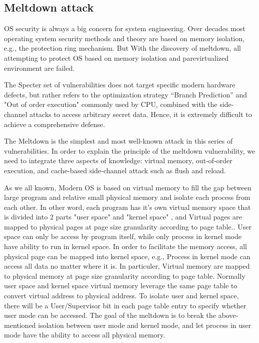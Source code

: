 \subsection{Meltdown attack}

OS security is always a big concern for system engineering. 
Over decades most operating system security methods and theory are based on memory isolation, 
e.g., the protection ring mechanism. But With the discovery of meltdown, all attempting to protect 
OS based on memory isolation and parevirtualized environment are failed.

The Specter set of vulnerabilities does not target specific modern hardware defects, 
but rather refers to the optimization strategy “Branch Prediction” and "Out of order execution" 
commonly used by CPU, combined with the side-channel attacks to access arbitrary secret data.
Hence, it is extremely difficult to achieve a comprehensive defense.

The Meltdown is the simplest and most well-known attack in this series of vulnerabilities. 
In order to explain the principle of the meltdown vulnerability, we need to integrate 
three aspects of knowledge: virtual memory, out-of-order execution, and cache-based side-channel 
attack such as flush and reload.

As we all known, Modern OS is based on virtual memory to fill the gap between 
large program and relative small physical memory and isolate each process from 
each other. In other word, each program has it's own virtual memory space that is 
divided into 2 parts "user space" and "kernel space" , and Virtual pages are mapped 
to physical pages at page size granularity according to page table.. User space can
only be access by program itself, while only process in kernel mode have ability to 
run in kernel space. In order to facilitate the memory access, all physical page can
be mapped into kernel space, e.g., Process in kernel mode can access all data no
matter where it is. In particuler,  Virtual memory are mapped to physical memory 
at page size granularity according to page table. Normally user space and kernel
space virtual memory leverage the same page table to 
convert virtual address to physical address.
 To isolate user and kernel space, there will be 
 a User/Supervisor bit in each page table entry to specify 
 whether user mode can be accessed. The goal of the meltdown 
 is to break the above-mentioned isolation between user mode and kernel mode, 
 and let process in user mode have the ability to access all physical memory.

